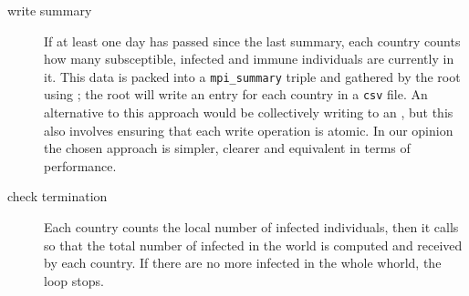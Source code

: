 \begin{description}
    \item[write summary] If at least one day has passed since the last summary, each country counts how many subsceptible, infected and immune individuals are currently in it. This data is packed into a \texttt{mpi\_summary} triple and gathered by the root using \MPIGather; the root will write an entry for each country in a \texttt{csv} file. An alternative to this approach would be collectively writing to an \MPIFile , but this also involves ensuring that each write operation is atomic. In our opinion the chosen approach is simpler, clearer and equivalent in terms of performance.
     
    \item[check termination] Each country counts the local number of infected individuals, then it calls \MPIAllreduce so that the total number of infected in the world is computed and received by each country. If there are no more infected in the whole whorld, the loop stops.
\end{description}

